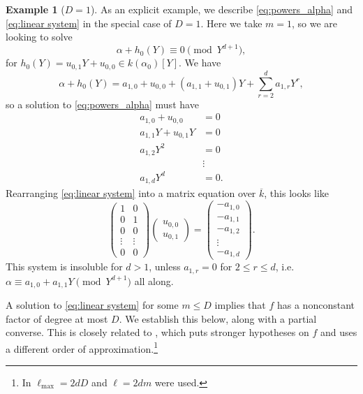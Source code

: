 \documentclass{amsart}
\newcommand{\lmax}{\ell_{\max}}
\theoremstyle{definition}
\newtheorem{example}[theorem]{Example}
\numberwithin{equation}{section}
\numberwithin{table}{section}
\begin{document}
\begin{example}[$D=1$]
	As an explicit example, we describe \eqref{eq:powers_alpha} and \eqref{eq:linear system} in the special case of $D=1$. Here we take $m=1$, so we are looking to solve
	\[\alpha + h_0(Y) \equiv 0 \pmod{Y^{d+1}},\]
	for $h_0(Y) = u_{0,1}Y + u_{0,0} \in k(\alpha_0)[Y]$. We have
    \[\alpha + h_0(Y) = a_{1,0} + u_{0,0} + (a_{1,1} + u_{0,1})Y + \sum_{r=2}^{d} a_{1,r}Y^r,\]
    so a solution to \eqref{eq:powers_alpha} must have
	\begin{align*}
		a_{1,0} + u_{0,0} &= 0 \\
		a_{1,1}Y + u_{0,1}Y &= 0 \\
		a_{1,2}Y^2 &= 0 \\
		&\vdots \\
		a_{1,d}Y^{d} &= 0.
	\end{align*}
	Rearranging \eqref{eq:linear system} into a matrix equation over $\overline{k}$, this looks like
	\[\begin{pmatrix} 
		1 & 0 \\
		0 & 1 \\
		0 & 0 \\
		\vdots & \vdots \\
		0 & 0 
	\end{pmatrix}
	\begin{pmatrix}
		u_{0,0} \\ u_{0,1}
	\end{pmatrix} = 
	\begin{pmatrix}
		-a_{1,0} \\ -a_{1,1} \\ -a_{1,2} \\ \vdots \\ -a_{1,d}
	\end{pmatrix}.
	\]
	This system is insoluble for $d > 1$, unless $a_{1,r} = 0$ for $2 \leq r \leq d$, i.e.\ $\alpha \equiv a_{1,0} + a_{1,1}Y \pmod{Y^{d+1}}$ all along.
\end{example}

A solution to \eqref{eq:linear system} for some $m \leq D$ implies that $f$ has a nonconstant factor of degree at most $D$. We establish this below, along with a partial converse. This is closely related to \cite[Lemma 3.1]{CafureMatera}, which puts stronger hypotheses on $f$ and uses a different order of approximation.\footnote{In \cite[\S 3.1]{CafureMatera} $\lmax = 2dD$ and $\ell = 2dm$ were used.}
\end{document}
